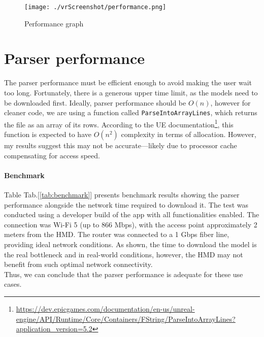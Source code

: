 \begin{figure}[ht]
  \centering
  \texttt{[image: ./vrScreenshot/performance.png]}
  \caption{Performance graph}
  \label{fig:performance}
\end{figure}

\section{Parser performance}\noindent
The parser performance must be efficient enough to avoid making the user wait too long. Fortunately, there is a generous upper time limit, as the models need to be downloaded first.
Ideally, parser performance should be $O(n)$, however for cleaner code, we are using a function called \texttt{ParseIntoArrayLines}, which returns the file as an array of its rows.
According to the \ac{UE} documentation\footnote{\url{https://dev.epicgames.com/documentation/en-us/unreal-engine/API/Runtime/Core/Containers/FString/ParseIntoArrayLines?application_version=5.2}}, this function is expected to have $O(n^2)$ complexity in terms of allocation.
However, my results suggest this may not be accurate—likely due to processor cache compensating for access speed.

\paragraph{Benchmark}
Table Tab.[\ref{tab:benchmark}] presents benchmark results showing the parser performance alongside the network time required to download it.
The test was conducted using a developer build of the app with all functionalities enabled. The connection was Wi-Fi 5 (up to 866 Mbps), with the access point approximately 2 meters from the \ac{HMD}.
The router was connected to a 1 Gbps fiber line, providing ideal network conditions.
As shown, the time to download the model is the real bottleneck and in real-world conditions, however, the \ac{HMD} may not benefit from such optimal network connectivity.\\
Thus, we can conclude that the parser performance is adequate for these use cases.

